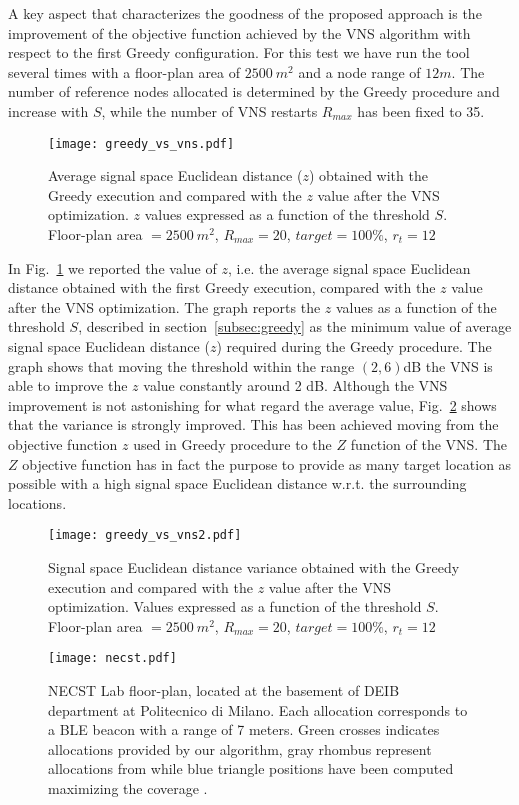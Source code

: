 A key aspect that characterizes the goodness of the proposed approach is the improvement of the objective function achieved by the VNS algorithm with respect to the first Greedy configuration. For this test we have run the tool several times with a floor-plan area of $2500~m^2$ and a node range of $12m$. The number of reference nodes allocated is determined by the Greedy procedure and increase with $S$, while the number of VNS restarts $R_{max}$ has been fixed to 35.
\begin{figure}[h!tb]
\centering\texttt{[image: greedy\_vs\_vns.pdf]}
\caption{Average signal space Euclidean distance ($z$) obtained with the Greedy execution and compared with the $z$ value after the VNS optimization. $z$ values expressed as a function of the threshold $S$. Floor-plan area $=2500~m^2$, $R_{max} = 20$, $target = 100\%$, $r_t=12$}
\label{fig:greedy_vns}
\end{figure}
In Fig.~\ref{fig:greedy_vns} we reported the value of $z$, i.e. the average signal space Euclidean distance obtained with the first Greedy execution, compared with the $z$ value after the VNS optimization. The graph reports the $z$ values as a function of the threshold $S$, described in section~\ref{subsec:greedy} as the minimum value of average signal space Euclidean distance ($z$) required during the Greedy procedure. The graph shows that moving the threshold within the range $(2,6)$dB the VNS is able to improve the $z$ value constantly around 2 dB.
Although the VNS improvement is not astonishing for what regard the average value, Fig.~\ref{fig:greedy_vns2} shows that the variance is strongly improved. This has been achieved moving from the objective function $z$ used in Greedy procedure to the $Z$ function of the VNS. The $Z$ objective function has in fact the purpose to provide as many target location as possible with a high signal space Euclidean distance w.r.t. the surrounding locations.

\begin{figure}[h!tb]
\centering\texttt{[image: greedy\_vs\_vns2.pdf]}
\caption{Signal space Euclidean distance variance obtained with the Greedy execution and compared with the $z$ value after the VNS optimization. Values expressed as a function of the threshold $S$. Floor-plan area $=2500~m^2$, $R_{max} = 20$, $target = 100\%$, $r_t=12$}
\label{fig:greedy_vns2}
\end{figure}

\begin{figure}
\centering\texttt{[image: necst.pdf]}
\caption[NECST Lab floor-plan used as indoor environment testbed for deployments evaluation.]{NECST Lab floor-plan, located at the basement of DEIB department at Politecnico di Milano. Each allocation corresponds to a BLE beacon with a range of 7 meters. Green crosses indicates allocations provided by our algorithm, gray rhombus represent allocations from \cite{He2011} while blue triangle positions have been computed maximizing the coverage \cite{Kouakou2010a}.}
\label{fig:necst}
\end{figure}

